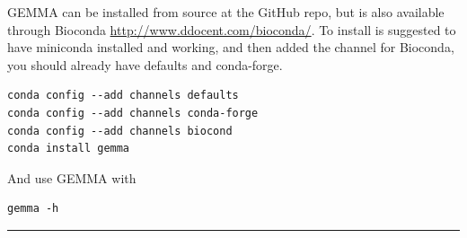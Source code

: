 GEMMA can be installed from source at the GitHub repo, but is also
available through Bioconda \url{http://www.ddocent.com/bioconda/}. To
install is suggested to have miniconda installed and working, and then
added the channel for Bioconda, you should already have defaults and
conda-forge.

\begin{verbatim}
conda config --add channels defaults
conda config --add channels conda-forge
conda config --add channels biocond
conda install gemma
\end{verbatim}

And use GEMMA with

\begin{verbatim}
gemma -h
\end{verbatim}

\begin{center}\rule{0.5\linewidth}{0.5pt}\end{center}
